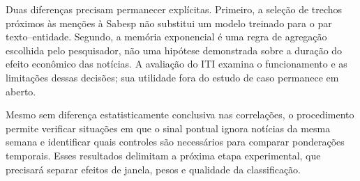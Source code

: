 Duas diferenças precisam permanecer explícitas. Primeiro, a seleção de trechos próximos às menções à Sabesp não substitui um modelo treinado para o par texto--entidade. Segundo, a memória exponencial é uma regra de agregação escolhida pelo pesquisador, não uma hipótese demonstrada sobre a duração do efeito econômico das notícias. A avaliação do ITI examina o funcionamento e as limitações dessas decisões; sua utilidade fora do estudo de caso permanece em aberto.

Mesmo sem diferença estatisticamente conclusiva nas correlações, o procedimento permite verificar situações em que o sinal pontual ignora notícias da mesma semana e identificar quais controles são necessários para comparar ponderações temporais. Esses resultados delimitam a próxima etapa experimental, que precisará separar efeitos de janela, pesos e qualidade da classificação.
